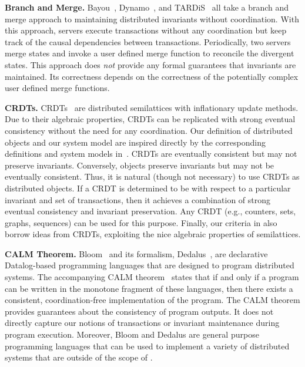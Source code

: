 \textbf{Branch and Merge.}
Bayou~\cite{terry1995managing}, Dynamo~\cite{decandia2007dynamo}, and
TARDiS~\cite{crooks2016tardis} all take a branch and merge approach to
maintaining distributed invariants without coordination. With this approach,
servers execute transactions without any coordination but keep track of the
causal dependencies between transactions. Periodically, two servers merge
states and invoke a user defined merge function to reconcile the divergent
states. This approach does \emph{not} provide any formal guarantees that
invariants are maintained. Its correctness depends on the correctness of the
potentially complex user defined merge functions.

\textbf{CRDTs.}
CRDTs~\cite{shapiro2011conflict, shapiro2011comprehensive} are distributed
semilattices with inflationary update methods. Due to their algebraic
properties, CRDTs can be replicated with strong eventual consistency without
the need for any coordination. Our definition of distributed objects and our
\invariantconfluence{} system model are inspired directly by the corresponding
definitions and system models in~\cite{shapiro2011conflict}.
%
CRDTs are eventually consistent but may not preserve invariants. Conversely,
\invariantconfluent{} objects preserve invariants but may not be eventually
consistent. Thus, it is natural (though not necessary) to use CRDTs as
distributed objects. If a CRDT is determined to be \invariantconfluent{} with
respect to a particular invariant and set of transactions, then it achieves a
combination of strong eventual consistency and invariant preservation. Any CRDT
(e.g., counters, sets, graphs, sequences) can be used for this purpose.
%
Finally, our criteria in  also borrow ideas from CRDTs,
exploiting the nice algebraic properties of semilattices.

\textbf{CALM Theorem.}
Bloom~\cite{alvaro2010boom, alvaro2011consistency, conway2012logic} and its
formalism, Dedalus~\cite{alvaro2011dedalus, alvaro2013declarative}, are
declarative Datalog-based programming languages that are designed to program
distributed systems. The accompanying CALM
theorem~\cite{hellerstein2010declarative, ameloot2013relational} states that if
and only if a program can be written in the monotone fragment of these
languages, then there exists a consistent, coordination-free implementation of
the program.  The CALM theorem provides guarantees about the consistency of
program outputs. It does not directly capture our notions of transactions or
invariant maintenance during program execution.  Moreover, Bloom and Dedalus
are general purpose programming languages that can be used to implement a
variety of distributed systems that are outside of the scope of
\invariantconfluence{}.

